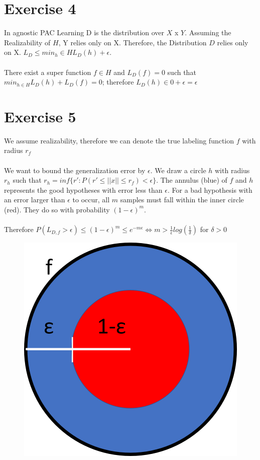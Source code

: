 \documentclass[12pt]{article}
\begin{document}
\section *{Exercise 4}
In agnostic PAC Learning D is the distribution over $X$ x $Y$. Assuming the Realizability of $H$, Y relies only on X. Therefore, the Distribution $D$ relies only on X.
$L_D \leq min_h \in H L_D (h) + \epsilon$.
\\ \\
There exist a super function $f \in H$ and $L_D (f) = 0$ such that
$min_{h \in H} L_D (h)+L_D (f) = 0$; therefore
$L_D(h) \in 0+ \epsilon = \epsilon$

\section*{Exercise 5}

We assume realizability, therefore we can denote the true labeling function $f$ with radius $r_f$
\\ \\
We want to bound the generalization error by $\epsilon$. We draw a circle $h$ with radius $r_h$ such that $r_h = inf\{r' : P(r' \leq ||x|| \leq r_f) < \epsilon\}$. The annulus (blue) of $f$ and $h$ represents the good hypotheses with error less than $\epsilon$. For a bad hypothesis with an error larger than $\epsilon$ to occur, all $m$ samples must fall within the inner circle (red). They do so with probability $(1-\epsilon)^m$.
\\ \\
Therefore $P(L_{D,f} > \epsilon) \leq (1-\epsilon)^m \leq e^{-m\epsilon} \Leftrightarrow m > \frac{1}{\epsilon} log(\frac{1}{\delta})$ for $\delta > 0$


\begin{figure}
	\centering
	\includegraphics[width=0.7\linewidth]{Bild1}
\end{figure}
\end{document}
